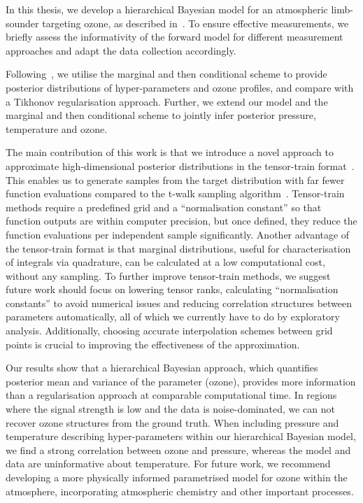In this thesis, we develop a hierarchical Bayesian model for an atmospheric limb-sounder targeting ozone, as described in~\cite{mipas2000handbook}.
To ensure effective measurements, we briefly assess the informativity of the forward model for different measurement approaches and adapt the data collection accordingly.

Following~\cite{fox2016fast}, we utilise the marginal and then conditional scheme to provide posterior distributions of hyper-parameters and ozone profiles, and compare with a Tikhonov regularisation approach.
Further, we extend our model and the marginal and then conditional scheme to jointly infer posterior pressure, temperature and ozone.

The main contribution of this work is that we introduce a novel approach to approximate high-dimensional posterior distributions in the tensor-train format~\cite{cui2022deep}.
This enables us to generate samples from the target distribution with far fewer function evaluations compared to the t-walk sampling algorithm~\cite{christen2010general}.
Tensor-train methods require a predefined grid and a ``normalisation constant'' so that function outputs are within computer precision, but once defined, they reduce the function evaluations per independent sample significantly.
Another advantage of the tensor-train format is that marginal distributions, useful for characterisation of integrals via quadrature, can be calculated at a low computational cost, without any sampling.
To further improve tensor-train methods, we suggest future work should focus on lowering tensor ranks, calculating ``normalisation constants'' to avoid numerical issues and reducing correlation structures between parameters automatically, all of which we currently have to do by exploratory analysis.
Additionally, choosing accurate interpolation schemes between grid points is crucial to improving the effectiveness of the approximation.

Our results show that a hierarchical Bayesian approach, which quantifies posterior mean and variance of the parameter (ozone), provides more information than a regularisation approach at comparable computational time.
In regions where the signal strength is low and the data is noise-dominated, we can not recover ozone structures from the ground truth.
When including pressure and temperature describing hyper-parameters within our hierarchical Bayesian model, we find a strong correlation between ozone and pressure, whereas the model and data are uninformative about temperature.
For future work, we recommend developing a more physically informed parametrised model for ozone within the atmosphere, incorporating atmospheric chemistry and other important processes.